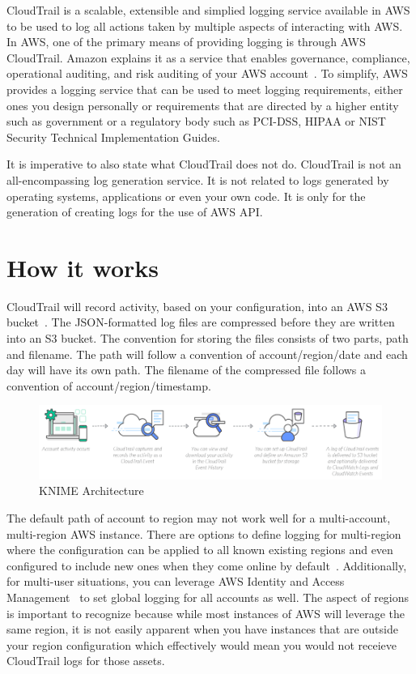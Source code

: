 CloudTrail is a scalable, extensible and simplied logging service available 
in AWS to be used to log all actions taken by multiple aspects of interacting
with AWS. In AWS, one of the primary means of providing logging is through AWS 
CloudTrail. Amazon explains it as a service that enables governance, 
compliance, operational auditing, and risk auditing of your AWS 
account~\cite{hid-sp18-518-CloudTrail-user-guide}. To simplify, AWS provides 
a logging service that can be used to meet logging requirements, either ones
you design personally or requirements that are directed by a higher entity 
such as government or a regulatory body such as PCI-DSS, HIPAA or NIST
Security Technical Implementation Guides.

It is imperative to also state what CloudTrail does not do. CloudTrail is
not an all-encompassing log generation service. It is not related to logs 
generated by operating systems, applications or even your own code. It is 
only for the generation of creating logs for the use of AWS API.

\section{How it works}

CloudTrail will record activity, based on your configuration, into an 
AWS S3 bucket~\cite{hid-sp18-518-CloudTrail-log-example}.
The JSON-formatted log files are compressed before they are written into an 
S3 bucket. The convention for storing the files consists of two 
parts, path and filename. The path will follow a convention of 
account/region/date and each day will have its own path.  The filename of the 
compressed file follows a convention of account/region/timestamp. 

\begin{figure}[!ht]
	\centering\includegraphics[width=\columnwidth]{../images/Cloudtrail-How-it-works.png}
	\caption{KNIME Architecture~\cite{hid-sp18-518-CloudTrail-CloudFormation-Image}}
 	\label{fig:CloudTrail}
\end{figure}

The default path of account to region may not work well for a multi-account, 
multi-region AWS instance. There are options to define logging for multi-region 
where the configuration can be applied to all known existing regions and even 
configured to include new ones when they come online by 
default~\cite{hid-sp18-518-CloudTrail-global-events}. Additionally, 
for multi-user situations, you can leverage AWS Identity and Access 
Management~\cite{hid-sp18-518-CloudTrail-IAM} to set global logging for all 
accounts as well. The aspect of regions is important to recognize because 
while most instances of AWS will leverage the same region, it is not easily
apparent when you have instances that are outside your region configuration
which effectively would mean you would not receieve CloudTrail logs for 
those assets.

